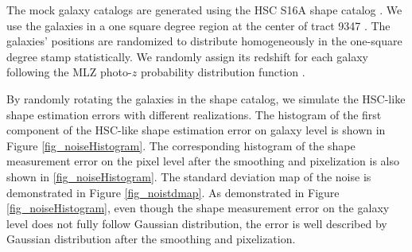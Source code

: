 The mock galaxy catalogs are generated using the HSC S16A shape catalog
\citep{HSC1-catalog}.  We use the galaxies in a one square degree region at the
center of tract 9347 \citep{HSC1-data}.  The galaxies' positions are randomized
to distribute homogeneously  in the one-square degree stamp statistically. We
randomly assign its redshift for each galaxy following the MLZ photo-$z$
probability distribution function \citep{HSC1-photoz}.

By randomly rotating the galaxies in the shape catalog, we simulate the
HSC-like shape estimation errors with different realizations.  The histogram of
the first component of the HSC-like shape estimation error on galaxy level is
shown in Figure \ref{fig_noiseHistogram}.  The corresponding histogram of the
shape measurement error on the pixel level after the smoothing and pixelization is
also shown in \ref{fig_noiseHistogram}. The standard deviation map of the
noise is demonstrated in Figure \ref{fig_noistdmap}. As demonstrated in Figure
\ref{fig_noiseHistogram}, even though the shape measurement error on the galaxy
level does not fully follow Gaussian distribution, the error is well described
by Gaussian distribution after the smoothing and pixelization.
